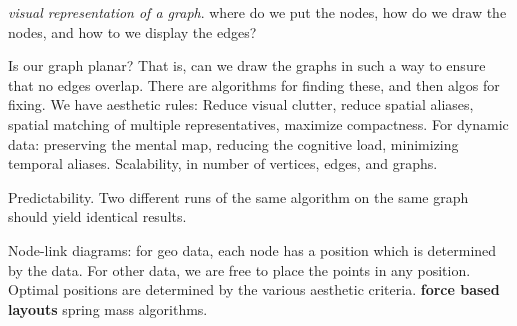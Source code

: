 \documentclass[]{article}
\begin{document}
\textit{visual representation of a graph}. where do we put the nodes, how do we draw the nodes, and how to we display the edges?

Is our graph planar? That is, can we draw the graphs in such a way to ensure that no edges overlap. There are algorithms for finding these, and then algos for fixing. We have aesthetic rules: Reduce visual clutter, reduce spatial aliases, spatial matching of multiple representatives, maximize compactness. For dynamic data: preserving the mental map, reducing the cognitive load, minimizing temporal aliases. Scalability, in number of vertices, edges, and graphs.

Predictability. Two different runs of the same algorithm on the same graph should yield identical results. 

Node-link diagrams: for geo data, each node has a position which is determined by the data. For other data, we are free to place the points in any position. Optimal positions are determined by the various aesthetic criteria. \textbf{force based layouts} spring mass algorithms. 
\end{document}
